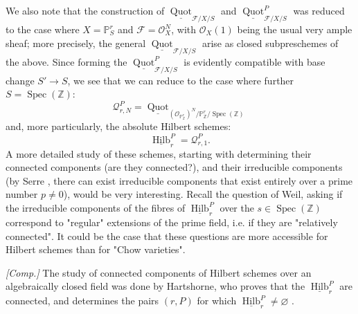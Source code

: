 \begin{remark}\label{fga3.iv-3-remarks-3.9}
  We also note that the construction of $\underline{\operatorname{Quot}}_{\mathcal{F}/X/S}$ and $\underline{\operatorname{Quot}}_{\mathcal{F}/X/S}^P$ was reduced to the case where $X=\mathbb{P}_S^r$ and $\mathcal{F}=\mathcal{O}_X^N$, with $\mathcal{O}_X(1)$ being the usual very ample sheaf;
  more precisely, the general $\underline{\operatorname{Quot}}_{\mathcal{F}/X/S}$ arise as closed subpreschemes of the above.
  Since forming the $\underline{\operatorname{Quot}}_{\mathcal{F}/X/S}^P$ is evidently compatible with base change $S'\to S$, we see that we can reduce to the case where further $S=\operatorname{Spec}(\mathbb{Z})$:
  \[
    \mathcal{Q}_{r,N}^P
    = \underline{\operatorname{Quot}}_{(\mathcal{O}_{\mathbb{P}_{\mathbb{Z}}^r})^N/\mathbb{P}_{\mathbb{Z}}^r/\operatorname{Spec}(\mathbb{Z})}
  \]
  and, more particularly, the absolute Hilbert schemes:
  \[
    \underline{\operatorname{Hilb}}_r^P
    = \mathcal{Q}_{r,1}^P.
  \]
  A more detailed study of these schemes, starting with determining their connected components (are they connected?), and their irreducible components (by Serre \cite{Ser1961}, there can exist irreducible components that exist entirely over a prime number $p\neq0$), would be very interesting.
  Recall the question of Weil, asking if the irreducible components of the fibres of $\underline{\operatorname{Hilb}}_r^P$ over the $s\in\operatorname{Spec}(\mathbb{Z})$ correspond to "regular" extensions of the prime field, i.e. if they are "relatively connected".
  It could be the case that these questions are more accessible for Hilbert schemes than for "Chow varieties".

  \emph{[Comp.]}
  The study of connected components of Hilbert schemes over an algebraically closed field was done by Hartshorne, who proves that the $\underline{\operatorname{Hilb}}_r^P$ are connected, and determines the pairs $(r,P)$ for which $\underline{\operatorname{Hilb}}_r^P\neq\varnothing$ \cite{Har1966}.
\end{remark}